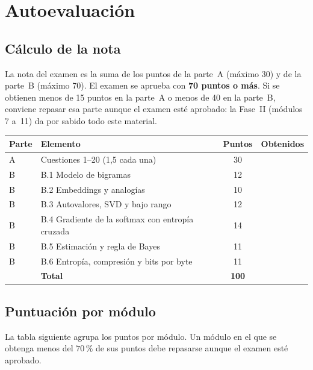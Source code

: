 \chapter{Autoevaluación}
\label{ap:autoevaluacion}

\section{Cálculo de la nota}

La nota del examen es la suma de los puntos de la parte~A (máximo 30) y de la parte~B (máximo 70). El examen se aprueba con \textbf{70 puntos o más}. Si se obtienen menos de 15 puntos en la parte~A o menos de 40 en la parte~B, conviene repasar esa parte aunque el examen esté aprobado: la Fase~II (módulos 7 a~11) da por sabido todo este material.

\begin{center}
\begin{tabular}{@{}llcc@{}}
\toprule
Parte & Elemento & Puntos & Obtenidos \\
\midrule
A & Cuestiones 1--20 (1,5 cada una) & 30 & \\
\midrule
B & B.1 Modelo de bigramas & 12 & \\
B & B.2 Embeddings y analogías & 10 & \\
B & B.3 Autovalores, SVD y bajo rango & 12 & \\
B & B.4 Gradiente de la softmax con entropía cruzada & 14 & \\
B & B.5 Estimación y regla de Bayes & 11 & \\
B & B.6 Entropía, compresión y bits por byte & 11 & \\
\midrule
 & \textbf{Total} & \textbf{100} & \\
\bottomrule
\end{tabular}
\end{center}

\section{Puntuación por módulo}

La tabla siguiente agrupa los puntos por módulo. Un módulo en el que se obtenga menos del $70\,\%$ de sus puntos debe repasarse aunque el examen esté aprobado.

